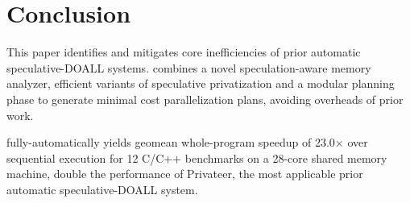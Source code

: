 \section{Conclusion}

This paper identifies and mitigates core inefficiencies of prior
automatic speculative-DOALL systems. \name combines a novel
speculation-aware memory analyzer, efficient variants of speculative
privatization and a modular planning phase to generate minimal cost
parallelization plans, avoiding overheads of prior work.
%

\name fully-automatically yields geomean whole-program speedup of
23.0$\times$ over sequential execution for 12 C/C++ benchmarks on a 28-core
shared memory machine, double the performance of Privateer, the most
applicable prior automatic speculative-DOALL system.

